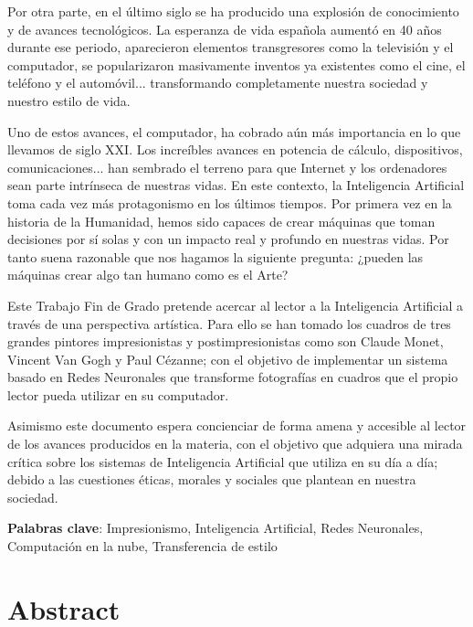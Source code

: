 \documentclass[a4paper]{report}
\newcommand\paginablanco{%
    \null
    \thispagestyle{empty}%
    \newpage}
\newcommand{\tfg}{Trabajo Fin de Grado }
\begin{document}
Por otra parte, en el último siglo se ha producido una explosión de conocimiento y de avances tecnológicos. La esperanza de vida española aumentó en 40 años durante ese periodo, aparecieron elementos transgresores como la televisión y el computador, se popularizaron masivamente inventos ya existentes como el cine, el teléfono y el automóvil... transformando completamente nuestra sociedad y nuestro estilo de vida. \newline

Uno de estos avances, el computador, ha cobrado aún más importancia en lo que llevamos de siglo XXI. Los increíbles avances en potencia de cálculo, dispositivos, comunicaciones... han sembrado el terreno para que Internet y los ordenadores sean parte intrínseca de nuestras vidas. En este contexto, la Inteligencia Artificial toma cada vez más protagonismo en los últimos tiempos. Por primera vez en la historia de la Humanidad, hemos sido capaces de crear máquinas que toman decisiones por sí solas y con un impacto real y profundo en nuestras vidas. Por tanto suena razonable que nos hagamos la siguiente pregunta: ¿pueden las máquinas crear algo tan humano como es el Arte? \newline

Este \tfg pretende acercar al lector a la Inteligencia Artificial a través de una perspectiva artística. Para ello se han tomado los cuadros de tres grandes pintores impresionistas y postimpresionistas como son Claude Monet, Vincent Van Gogh y Paul Cézanne; con el objetivo de implementar un sistema basado en Redes Neuronales que transforme fotografías en cuadros que el propio lector pueda utilizar en su computador. \newline

Asimismo este documento espera concienciar de forma amena y accesible al lector de los avances producidos en la materia, con el objetivo que adquiera una mirada crítica sobre los sistemas de Inteligencia Artificial que utiliza en su día a día; debido a las cuestiones éticas, morales y sociales que plantean en nuestra sociedad. \newline

\textbf{Palabras clave}: Impresionismo, Inteligencia Artificial, Redes Neuronales, Computación en la nube, Transferencia de estilo

\newpage
\paginablanco{}

\chapter*{Abstract} %
\end{document}
